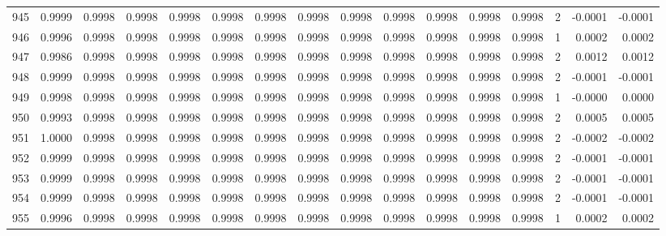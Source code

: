 \begin{tabular}{lrrrrrrrrrrrrrrr}
945 &      0.9999 &  0.9998 &  0.9998 &  0.9998 &  0.9998 &  0.9998 &  0.9998 &  0.9998 &  0.9998 &  0.9998 &   0.9998 &     0.9998 &      2 &                   -0.0001 &                    -0.0001 \\
946 &      0.9996 &  0.9998 &  0.9998 &  0.9998 &  0.9998 &  0.9998 &  0.9998 &  0.9998 &  0.9998 &  0.9998 &   0.9998 &     0.9998 &      1 &                    0.0002 &                     0.0002 \\
947 &      0.9986 &  0.9998 &  0.9998 &  0.9998 &  0.9998 &  0.9998 &  0.9998 &  0.9998 &  0.9998 &  0.9998 &   0.9998 &     0.9998 &      2 &                    0.0012 &                     0.0012 \\
948 &      0.9999 &  0.9998 &  0.9998 &  0.9998 &  0.9998 &  0.9998 &  0.9998 &  0.9998 &  0.9998 &  0.9998 &   0.9998 &     0.9998 &      2 &                   -0.0001 &                    -0.0001 \\
949 &      0.9998 &  0.9998 &  0.9998 &  0.9998 &  0.9998 &  0.9998 &  0.9998 &  0.9998 &  0.9998 &  0.9998 &   0.9998 &     0.9998 &      1 &                   -0.0000 &                     0.0000 \\
950 &      0.9993 &  0.9998 &  0.9998 &  0.9998 &  0.9998 &  0.9998 &  0.9998 &  0.9998 &  0.9998 &  0.9998 &   0.9998 &     0.9998 &      2 &                    0.0005 &                     0.0005 \\
951 &      1.0000 &  0.9998 &  0.9998 &  0.9998 &  0.9998 &  0.9998 &  0.9998 &  0.9998 &  0.9998 &  0.9998 &   0.9998 &     0.9998 &      2 &                   -0.0002 &                    -0.0002 \\
952 &      0.9999 &  0.9998 &  0.9998 &  0.9998 &  0.9998 &  0.9998 &  0.9998 &  0.9998 &  0.9998 &  0.9998 &   0.9998 &     0.9998 &      2 &                   -0.0001 &                    -0.0001 \\
953 &      0.9999 &  0.9998 &  0.9998 &  0.9998 &  0.9998 &  0.9998 &  0.9998 &  0.9998 &  0.9998 &  0.9998 &   0.9998 &     0.9998 &      2 &                   -0.0001 &                    -0.0001 \\
954 &      0.9999 &  0.9998 &  0.9998 &  0.9998 &  0.9998 &  0.9998 &  0.9998 &  0.9998 &  0.9998 &  0.9998 &   0.9998 &     0.9998 &      2 &                   -0.0001 &                    -0.0001 \\
955 &      0.9996 &  0.9998 &  0.9998 &  0.9998 &  0.9998 &  0.9998 &  0.9998 &  0.9998 &  0.9998 &  0.9998 &   0.9998 &     0.9998 &      1 &                    0.0002 &                     0.0002 \\

\end{tabular}
